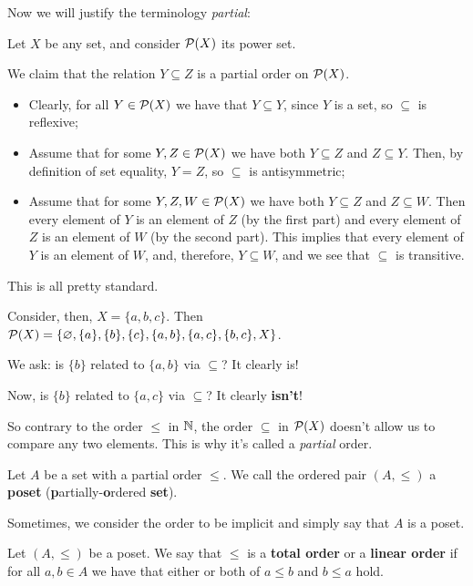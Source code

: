 Now we will justify the terminology \textit{partial}:

\begin{ex}
	Let $X$ be any set, and consider $\mathcal P(X)$ its power set.
	
	We claim that the relation $Y\subseteq Z$ is a partial order on $\mathcal P(X)$.
	
	\begin{itemize}
		\item Clearly, for all $Y\in \mathcal P(X)$ we have that $Y\subseteq Y$, since $Y$ is a set, so $\subseteq$ is reflexive;
		
		\item Assume that for some $Y,Z\in\mathcal P(X)$ we have both $Y\subseteq Z$ and $Z\subseteq Y$. Then, by definition of set equality, $Y=Z$, so $\subseteq$ is antisymmetric;
		
		\item Assume that for some $Y,Z,W\in\mathcal P(X)$ we have both $Y\subseteq Z$ and $Z\subseteq W$. Then every element of $Y$ is an element of $Z$ (by the first part) and every element of $Z$ is an element of $W$ (by the second part). This implies that every element of $Y$ is an element of $W$, and, therefore, $Y\subseteq W$, and we see that $\subseteq$ is transitive.
	\end{itemize}

This is all pretty standard.

Consider, then, $X=\{a,b,c\}$. Then $\mathcal P(X)=\{\varnothing, \{a\},\{b\},\{c\},\{a,b\},\{a,c\},\{b,c\},X\}$.

We ask: is $\{b\}$ related to $\{a,b\}$ via $\subseteq$? It clearly is!

Now, is $\{b\}$ related to $\{a,c\}$ via $\subseteq$? It clearly \textbf{isn't}!

So contrary to the order $\leq$ in $\mathbb N$, the order $\subseteq$ in $\mathcal P(X)$ doesn't allow us to compare any two elements. This is why it's called a \textit{partial} order.
\end{ex}

\begin{df}
	Let $A$ be a set with a partial order $\leq$. We call the ordered pair $(A,\leq)$ a \textbf{poset} (\textbf{p}artially-\textbf{o}rdered \textbf{set}).
	
	Sometimes, we consider the order to be implicit and simply say that $A$ is a poset.
\end{df}

\begin{df}
	Let $(A,\leq)$ be a poset. We say that $\leq$ is a \textbf{total order} or a \textbf{linear order} if for all $a,b\in A$ we have that either or both of $a\leq b$ and $b\leq a$ hold.
\end{df}

